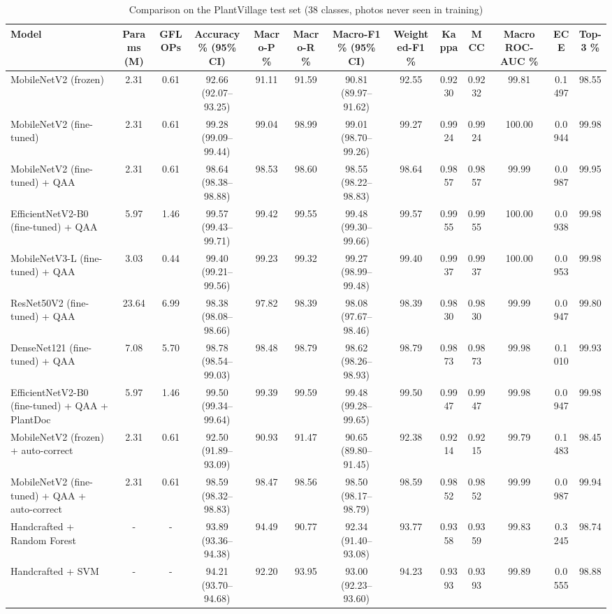 \begin{table}[t]
\centering
\small
\caption{Comparison on the PlantVillage test set (38 classes, photos never seen in training)}
\label{tab:table_main_comparison}
\begin{tabular}{lcccccccccccc}
\toprule
Model & Params (M) & GFLOPs & Accuracy \% (95\% CI) & Macro-P \% & Macro-R \% & Macro-F1 \% (95\% CI) & Weighted-F1 \% & Kappa & MCC & Macro ROC-AUC \% & ECE & Top-3 \% \\
\midrule
MobileNetV2 (frozen) & 2.31 & 0.61 & 92.66 (92.07–93.25) & 91.11 & 91.59 & 90.81 (89.97–91.62) & 92.55 & 0.9230 & 0.9232 & 99.81 & 0.1497 & 98.55 \\
MobileNetV2 (fine-tuned) & 2.31 & 0.61 & 99.28 (99.09–99.44) & 99.04 & 98.99 & 99.01 (98.70–99.26) & 99.27 & 0.9924 & 0.9924 & 100.00 & 0.0944 & 99.98 \\
MobileNetV2 (fine-tuned) + QAA & 2.31 & 0.61 & 98.64 (98.38–98.88) & 98.53 & 98.60 & 98.55 (98.22–98.83) & 98.64 & 0.9857 & 0.9857 & 99.99 & 0.0987 & 99.95 \\
EfficientNetV2-B0 (fine-tuned) + QAA & 5.97 & 1.46 & 99.57 (99.43–99.71) & 99.42 & 99.55 & 99.48 (99.30–99.66) & 99.57 & 0.9955 & 0.9955 & 100.00 & 0.0938 & 99.98 \\
MobileNetV3-L (fine-tuned) + QAA & 3.03 & 0.44 & 99.40 (99.21–99.56) & 99.23 & 99.32 & 99.27 (98.99–99.48) & 99.40 & 0.9937 & 0.9937 & 100.00 & 0.0953 & 99.98 \\
ResNet50V2 (fine-tuned) + QAA & 23.64 & 6.99 & 98.38 (98.08–98.66) & 97.82 & 98.39 & 98.08 (97.67–98.46) & 98.39 & 0.9830 & 0.9830 & 99.99 & 0.0947 & 99.80 \\
DenseNet121 (fine-tuned) + QAA & 7.08 & 5.70 & 98.78 (98.54–99.03) & 98.48 & 98.79 & 98.62 (98.26–98.93) & 98.79 & 0.9873 & 0.9873 & 99.98 & 0.1010 & 99.93 \\
EfficientNetV2-B0 (fine-tuned) + QAA + PlantDoc & 5.97 & 1.46 & 99.50 (99.34–99.64) & 99.39 & 99.59 & 99.48 (99.28–99.65) & 99.50 & 0.9947 & 0.9947 & 99.98 & 0.0947 & 99.98 \\
MobileNetV2 (frozen) + auto-correct & 2.31 & 0.61 & 92.50 (91.89–93.09) & 90.93 & 91.47 & 90.65 (89.80–91.45) & 92.38 & 0.9214 & 0.9215 & 99.79 & 0.1483 & 98.45 \\
MobileNetV2 (fine-tuned) + QAA + auto-correct & 2.31 & 0.61 & 98.59 (98.32–98.83) & 98.47 & 98.56 & 98.50 (98.17–98.79) & 98.59 & 0.9852 & 0.9852 & 99.99 & 0.0987 & 99.94 \\
Handcrafted + Random Forest & - & - & 93.89 (93.36–94.38) & 94.49 & 90.77 & 92.34 (91.40–93.08) & 93.77 & 0.9358 & 0.9359 & 99.83 & 0.3245 & 98.74 \\
Handcrafted + SVM & - & - & 94.21 (93.70–94.68) & 92.20 & 93.95 & 93.00 (92.23–93.60) & 94.23 & 0.9393 & 0.9393 & 99.89 & 0.0555 & 98.88 \\
\bottomrule
\end{tabular}
\end{table}
